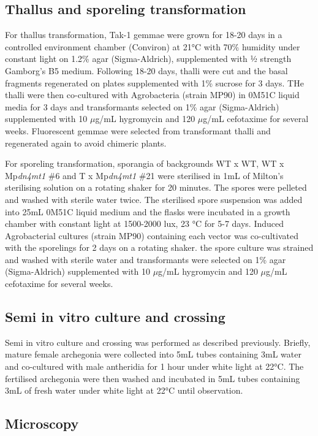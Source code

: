 \subsection{Thallus and sporeling transformation}

For thallus transformation, Tak-1 gemmae were grown for 18-20 days in a controlled environment chamber (Conviron) at 21°C with 70\% humidity under constant light on 1.2\% agar (Sigma-Aldrich), supplemented with ½ strength Gamborg's B5 medium. Following 18-20 days, thalli were cut and the basal fragments regenerated on plates supplemented with 1\% sucrose for 3 days. THe thalli were then co-cultured with Agrobacteria (strain MP90) in 0M51C liquid media for 3 days and transformants selected on 1\% agar (Sigma-Aldrich) supplemented with 10 $\mu$g/mL hygromycin and 120 $\mu$g/mL cefotaxime for several weeks. Fluorescent gemmae were selected from transformant thalli and regenerated again to avoid chimeric plants\cite{RN147}. 

For sporeling transformation, sporangia of backgrounds WT x WT, WT x Mp\textit{dn4mt1} \#6 and T x Mp\textit{dn4mt1} \#21 were sterilised in 1mL of Milton's sterilising solution on a rotating shaker for 20 minutes. The spores were pelleted and washed with sterile water twice. The sterilised spore suspension was added into 25mL 0M51C liquid medium and the flasks were incubated in a growth chamber with constant light at 1500-2000 lux, 23 °C for 5-7 days. Induced Agrobacterial cultures (strain MP90) containing each vector was co-cultivated with the sporelings for 2 days on a rotating shaker. the spore culture was strained and washed with sterile water and transformants were selected on 1\% agar (Sigma-Aldrich) supplemented with 10 $\mu$g/mL hygromycin and 120 $\mu$g/mL cefotaxime for several weeks\cite{RN146}.

\subsection{Semi in vitro culture and crossing}

Semi in vitro culture and crossing was performed as described previously\cite{RN139}. Briefly, mature female archegonia were collected into 5mL tubes containing 3mL water and co-cultured with male antheridia for 1 hour under white light at 22°C. The fertilised archegonia were then washed and incubated in 5mL tubes containing 3mL of fresh water under white light at 22°C until observation.

\subsection{Microscopy} 

